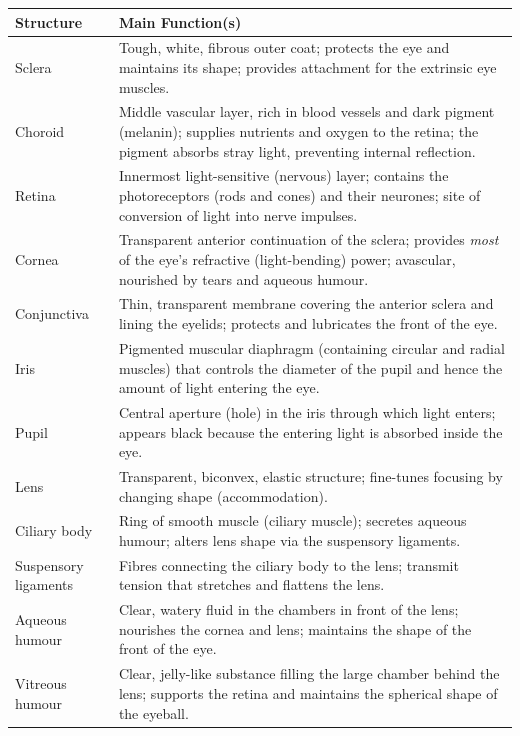 \documentclass[11pt]{article}
\newcommand{\cle}[1]{{\popxbold\color{popdark}#1}}
\begin{document}
\begin{center}
\begin{tabularx}{\linewidth}{|l|X|}\hline
\rowcolor{popblueL}
\textbf{Structure} & \textbf{Main Function(s)} \\ \hline
\cle{Sclera} & Tough, white, fibrous outer coat; protects the eye and maintains its shape; provides attachment for the extrinsic eye muscles. \\ \hline
\cle{Choroid} & Middle vascular layer, rich in blood vessels and dark pigment (melanin); supplies nutrients and oxygen to the retina; the pigment absorbs stray light, preventing internal reflection. \\ \hline
\cle{Retina} & Innermost light-sensitive (nervous) layer; contains the photoreceptors (rods and cones) and their neurones; site of conversion of light into nerve impulses. \\ \hline
\cle{Cornea} & Transparent anterior continuation of the sclera; provides \emph{most} of the eye's refractive (light-bending) power; avascular, nourished by tears and aqueous humour. \\ \hline
\cle{Conjunctiva} & Thin, transparent membrane covering the anterior sclera and lining the eyelids; protects and lubricates the front of the eye. \\ \hline
\cle{Iris} & Pigmented muscular diaphragm (containing circular and radial muscles) that controls the diameter of the pupil and hence the amount of light entering the eye. \\ \hline
\cle{Pupil} & Central aperture (hole) in the iris through which light enters; appears black because the entering light is absorbed inside the eye. \\ \hline
\cle{Lens} & Transparent, biconvex, elastic structure; fine-tunes focusing by changing shape (accommodation). \\ \hline
\cle{Ciliary body} & Ring of smooth muscle (ciliary muscle); secretes aqueous humour; alters lens shape via the suspensory ligaments. \\ \hline
\cle{Suspensory ligaments} & Fibres connecting the ciliary body to the lens; transmit tension that stretches and flattens the lens. \\ \hline
\cle{Aqueous humour} & Clear, watery fluid in the chambers in front of the lens; nourishes the cornea and lens; maintains the shape of the front of the eye. \\ \hline
\cle{Vitreous humour} & Clear, jelly-like substance filling the large chamber behind the lens; supports the retina and maintains the spherical shape of the eyeball. \\ \hline

\end{tabularx}
\end{center}
\end{document}
